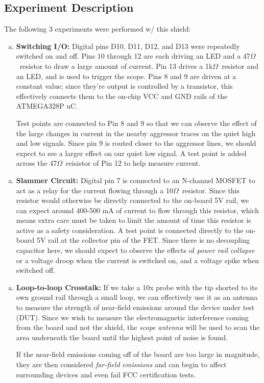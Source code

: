 \documentclass{article}
\newcommand*{\Ohm}{$\Omega$\ }
\newcommand*{\Indent}{\hspace*{1cm}}
\begin{document}
\subsection{Experiment Description}
The following 3 experiments were performed w/ this shield:
\begin{enumerate}[(a)]
    \item \textbf{Switching I/O:} Digital pins D10, D11, D12, and D13 were repeatedly switched on and off. Pins 10 through 12 are each driving an LED and a 47\Ohm resistor to draw a large amount of current. Pin 13 drives a 1k\Ohm resistor and an LED, and is used to trigger the scope. Pins 8 and 9 are driven at a constant value; since they're output is controlled by a transistor, this effectively connects them to the on-chip VCC and GND rails of the ATMEGA328P uC.

    \Indent Test points are connected to Pin 8 and 9 so that we can observe the effect of the large changes in current in the nearby aggressor traces on the quiet high and low signals. Since pin 9 is routed closer to the aggressor lines, we should expect to see a larger effect on our quiet low signal. A test point is added across the 47\Ohm reisistor of Pin 12 to help measure current.
\end{enumerate}

\begin{enumerate}[(b)]
    \item \textbf{Slammer Circuit:} Digital pin 7 is connected to an N-channel MOSFET to act as a relay for the current flowing through a 10\Ohm resistor. Since this resistor would otherwise be directly connected to the on-board 5V rail, we can expect around 400-500 mA of current to flow through this resistor, which means extra care must be taken to limit the amount of time this resistor is active as a safety consideration.  A test point is connected directly to the on-board 5V rail at the collector pin of the FET. Since there is no decoupling capacitor here, we should expect to observe the effects of \textit{power rail collapse} or a voltage droop when the current is switched on, and a voltage spike when switched off.
\end{enumerate}

\begin{enumerate}[(c)]
    \item \textbf{Loop-to-loop Crosstalk:} If we take a 10x probe with the tip shorted to its own ground rail through a small loop, we can effectively use it as an antenna to measure the strength of near-field emissions around the device under test (DUT). Since we wish to measure the electromagnetic interference coming from the board and not the shield, the \textit{scope antenna} will be used to scan the area underneath the board until the highest point of noise is found.
    
    \Indent If the near-field emissions coming off of the board are too large in magnitude, they are then considered \textit{far-field emissions} and can begin to affect surrounding devices and even fail FCC certification tests.
\end{enumerate}
\end{document}
